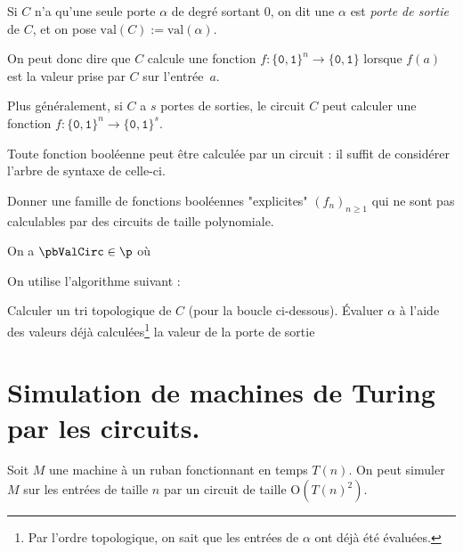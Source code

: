 \documentclass[./main]{subfiles}
\begin{document}
  \begin{defn}
    Si $C$ n'a qu'une seule porte $\alpha$ de degré sortant $0$, on dit une $\alpha$ est \textit{porte de sortie} de $C$, et on pose $\mathrm{val}(C) := \mathrm{val}(\alpha)$.

    On peut donc dire que $C$ calcule une fonction $f : \{\texttt{0}, \texttt{1}\}^n \to \{\texttt{0}, \texttt{1}\}$ lorsque $f(a)$ est la valeur prise par $C$ sur l'entrée~$a$.

    Plus généralement, si $C$ a $s$ portes de sorties, le circuit $C$ peut calculer une fonction $f : \{\texttt{0}, \texttt{1}\}^n \to \{\texttt{0}, \texttt{1}\}^ s$.
  \end{defn}

  \begin{rmk}
    Toute fonction booléenne peut être calculée par un circuit : il suffit de considérer l'arbre de syntaxe de celle-ci.
  \end{rmk}

  \begin{exo}
    Donner une famille de fonctions booléennes "explicites" $(f_n)_{n \ge 1}$ qui ne sont pas calculables par des circuits de taille polynomiale.
  \end{exo}

  \begin{lem}
    On a $\pbValCirc \in \p$ où

    \showValCirc
  \end{lem}
  \begin{prv}
    On utilise l'algorithme suivant :

    \begin{algorithmic}[1]
      \State Calculer un tri topologique de $C$ (pour la boucle ci-dessous).
      \State Évaluer $\alpha$ à l'aide des valeurs déjà calculées\footnote{Par l'ordre topologique, on sait que les entrées de $\alpha$ ont déjà été évaluées.}
      \EndFor
      \State \Return la valeur de la porte de sortie
    \end{algorithmic}
  \end{prv}

  \section{Simulation de machines de Turing par les circuits.}

  \begin{prop}
    Soit $M$ une machine à un ruban fonctionnant en temps $T(n)$. On peut simuler $M$ sur les entrées de taille $n$ par un circuit de taille $\mathrm{O}(T(n)^2)$.
  \end{prop}
\end{document}
